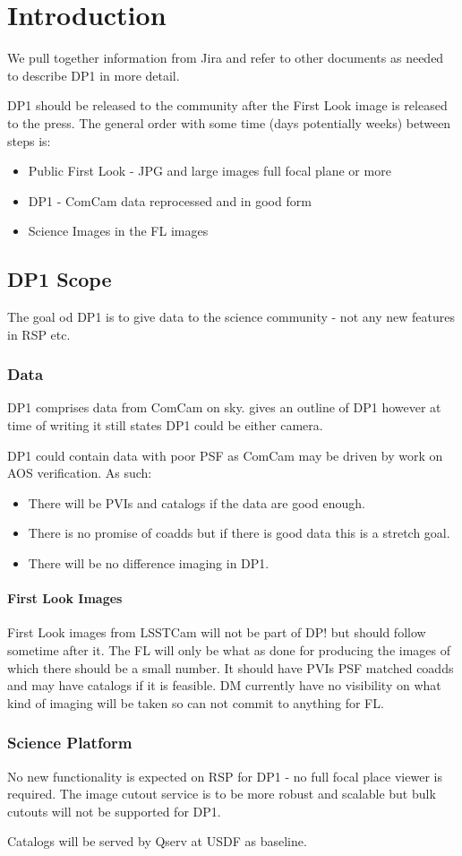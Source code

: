 \section{Introduction} \label{sec:intro}

We pull together information from Jira and refer to other documents as needed to describe DP1 in more detail.

DP1 should be released to the community after the First Look image is released to the press.
The general order with some time (days potentially weeks)  between steps is:

\begin{itemize}
\item Public First Look - JPG and large images full focal plane or more
\item DP1 - ComCam data reprocessed and in good form
\item Science Images in the FL images
\end{itemize}


\subsection{DP1 Scope} \label{sec:scope}
The goal od DP1 is to give data to the science community - not any new features in RSP etc.
\subsubsection{Data}
DP1 comprises data from ComCam on sky.
 gives an outline of DP1 however at time of writing it still states DP1 could be either camera.

DP1 could contain data with poor PSF as ComCam may be driven by work on AOS verification.
As such:
\begin{itemize}
\item There will be PVIs and catalogs if the data are good enough.
\item There is no promise of coadds but if there is good data this is a stretch goal.
\item There will be no difference imaging in DP1.
\end{itemize}

\paragraph{First Look Images} \label{sec:fl}

First Look images from LSSTCam will not be part of DP! but should follow sometime after it.
The FL will only be what as done for producing the images of which there should be a small number.
It should have PVIs PSF matched coadds  and  may have catalogs if it is feasible.
DM currently have no visibility on what kind of imaging will be taken so can not commit to anything for FL.

\subsubsection{Science Platform}
No new functionality is expected on RSP for DP1 - no full focal place viewer is required.
The image cutout service is to be more robust and scalable but bulk cutouts will not be supported for DP1.


Catalogs will be served by Qserv at USDF as baseline.





